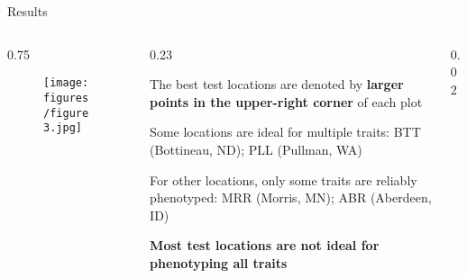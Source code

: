 \documentclass[final]{beamer}
\newlength{\twocolwid}
\begin{document}
\begin{frame}[t]
\begin{columns}[t]
\begin{column}{\twocolwid}
\begin{block}{Results}
\begin{columns}[t,totalwidth=\twocolwid]
\begin{column}{0.75\twocolwid}

\begin{center}
  \begin{figure}
    \texttt{[image: figures/figure3.jpg]}
  \end{figure}
\end{center}

\end{column}


\begin{column}{0.23\twocolwid}

The best test locations are denoted by \textbf{larger points in the upper-right corner} of each plot

\vspace{1cm}


Some locations are ideal for multiple traits: BTT (Bottineau, ND); PLL (Pullman, WA)

\vspace{1cm}

For other locations, only some traits are reliably phenotyped: MRR (Morris, MN); ABR (Aberdeen, ID)

\vspace{1cm}

\textbf{Most test locations are not ideal for phenotyping all traits}

\end{column}


\begin{column}{0.02\twocolwid}
\end{column}

\end{columns}

\vspace{4cm}






\end{block}
\end{column}
\end{columns}
\end{frame}
\end{document}
